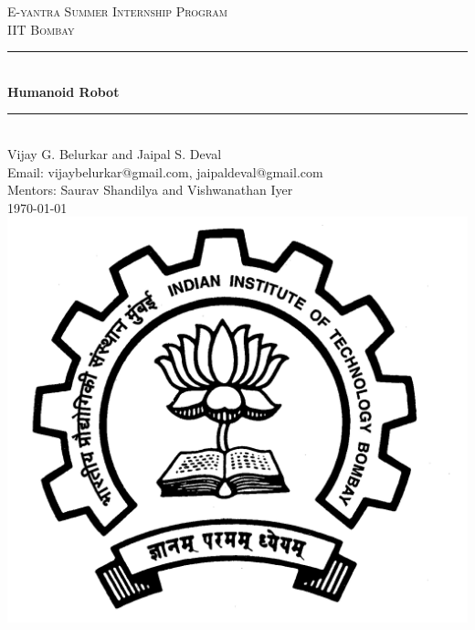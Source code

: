 \documentclass[12pt]{article}
\begin{document}
\begin{titlepage}
	
	\newcommand{\HRule}{\rule{\linewidth}{0.5mm}}
	
	\center
	\textsc{\LARGE E-yantra Summer Internship Program}\\
	\vspace{1cm}
	\textsc{\Large IIT Bombay}\\
	\vspace{2.5cm}
	\HRule \\[0.4cm]
	{ \Huge \bfseries Humanoid Robot}\\[0.4cm] %
	\HRule \\[1.5cm]
	
   \Large Vijay G. Belurkar and Jaipal S. Deval\\
   \small Email: vijaybelurkar@gmail.com, jaipaldeval@gmail.com\\
   \vspace{1cm}
	\large Mentors: Saurav Shandilya and Vishwanathan Iyer \\
	\vspace{1cm}
	{\large \today}\\
	\vspace{1cm}
	\includegraphics{iitlogo.jpg}\\[1cm] %
	
	
	\vfill %
	
\end{titlepage}
\end{document}
